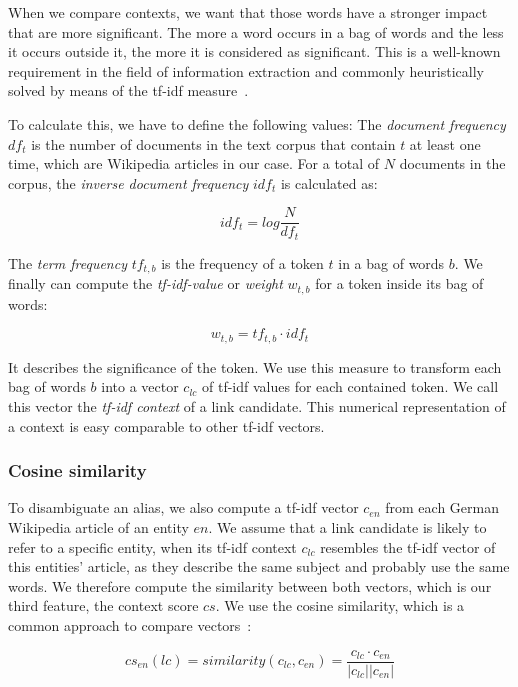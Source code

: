 When we compare contexts, we want that those words have a stronger impact that are more significant. The more a word occurs in a bag of words and the less it occurs outside it, the more it is considered as significant. This is a well-known requirement in the field of information extraction and commonly heuristically solved by means of the tf-idf measure~\cite{salton1988term}.

To calculate this, we have to define the following values: The \textit{document frequency} $df_t$ is the number of documents in the text corpus that contain $t$ at least one time, which are Wikipedia articles in our case. For a total of $N$ documents in the corpus, the \textit{inverse document frequency} $idf_t$ is calculated as:

\begin{equation*}
idf_t = log\frac{N}{df_t}
\end{equation*}

The \textit{term frequency} $tf_{t,b}$ is the frequency of a token $t$ in a bag of words $b$. We finally can compute the \textit{tf-idf-value} or \textit{weight} $w_{t,b}$ for a token inside its bag of words:

\begin{equation*}
w_{t,b} = tf_{t,b} \cdot idf_t
\end{equation*}

It describes the significance of the token. We use this measure to transform each bag of words $b$ into a vector $c_{lc}$ of tf-idf values for each contained token. We call this vector the \textit{tf-idf context} of a link candidate. This numerical representation of a context is easy comparable to other tf-idf vectors.


\subsubsection{Cosine similarity}
To disambiguate an alias, we also compute a tf-idf vector $c_{en}$ from each German Wikipedia article of an entity $en$. We assume that a link candidate is likely to refer to a specific entity, when its tf-idf context $c_{lc}$ resembles the tf-idf vector of this entities' article, as they describe the same subject and probably use the same words. We therefore compute the similarity between both vectors, which is our third feature, the context score $cs$. We use the cosine similarity, which is a common approach to compare vectors~\cite{ricardo1999modern, salton1988term}:

\begin{equation*}
cs_{en}(lc) = similarity(c_{lc}, c_{en}) = \frac{c_{lc} \cdot c_{en}}{|c_{lc}||c_{en}|}
\end{equation*}


